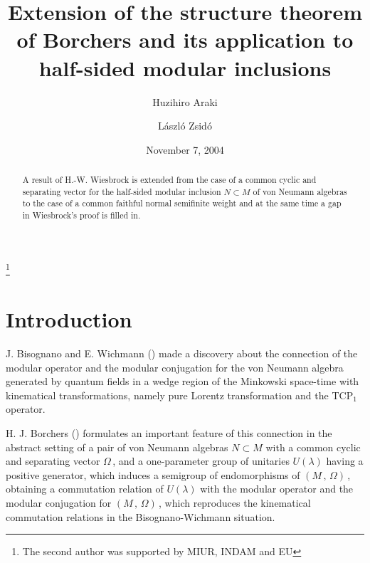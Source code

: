 \documentclass[reqno]{amsart}
\theoremstyle{definition}
\theoremstyle{remark}
\numberwithin{equation}{section}
\theoremstyle{plain}
\begin{document}
\title[Half-sided modular inclusions]{Extension of the structure
theorem of Borchers and its application to half-sided modular
inclusions}
\author{Huzihiro Araki}
\address{Research Institute for Mathematical Sciences, Kyoto University,
Sakyoku, Kyoto 606-8205, Japan}
\author{L\'aszl\'o Zsid\'o}
\address{Department of Mathematics, University of Rome ``Tor Vergata'',
Via della Ricerca Scientifica, 00133 Rome, Italy}
\date{November 7, 2004}
\renewcommand{\subjclassname}{\textup{2000} 
 Mathematics Subject Classification}
\thanks{The second author was supported by MIUR, INDAM and EU}

\begin{abstract}
A result of H.-W. Wiesbrock is extended from the case of a common
cyclic and separating vector for the half-sided modular inclusion
$N\subset M$ of von Neumann algebras to the case of a common
faithful normal semifinite weight and at the same time a gap in
Wiesbrock's proof is filled in.
\end{abstract}
\maketitle

\section{Introduction}

J. Bisognano and E. Wichmann (\cite{B-W}) made a discovery about the
connection of the modular operator and the modular conjugation for the
von Neumann algebra generated by quantum fields in a wedge region of
the Minkowski space-time with kinematical transformations, namely
pure Lorentz transformation and the TCP$_1$ operator.

H. J. Borchers (\cite{Bo2}) formulates an important feature of this
connection in the abstract setting of a pair of von Neumann algebras
$N\subset M$ with a common cyclic and separating vector $\Omega\,$,
and a one-parameter group of unitaries $U(\lambda )$ having a positive
generator, which induces a semigroup of endomorphisms of $(M\, ,\,
\Omega )\,$, obtaining a commutation relation of $U(\lambda )$ with
the modular operator and the modular conjugation for $(M\, ,\,
\Omega )\,$, which reproduces the kinematical commutation relations
in the Bisognano-Wichmann situation.
\end{document}
